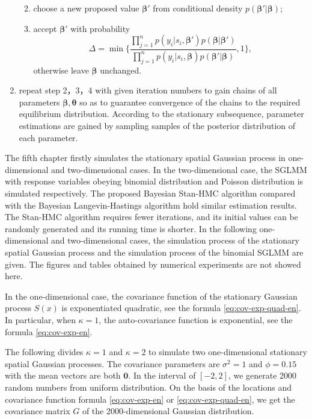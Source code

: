 \documentclass[12pt,a4paper,UTF8,twoside]{book}
\providecommand{\tightlist}{%
  \setlength{\itemsep}{0pt}\setlength{\parskip}{0pt}}
\begin{document}
\begin{enumerate}
  \begin{enumerate}
  \def\labelenumii{(\roman{enumii})}
  \tightlist
  \item
    choose a new proposed value \(\boldsymbol{\beta}'\) from conditional
    density \(p(\boldsymbol{\beta}'|\boldsymbol{\beta})\);
  \item
    accept \(\boldsymbol{\beta}'\) with probability
    \[\Delta = \min \big\{ \frac{\prod_{j=1}^{n}p(y_i|s_{i},\boldsymbol{\beta}')p(\boldsymbol{\beta}|\boldsymbol{\beta}')}{\prod_{j=1}^{n}p(y_i|s_{i},\boldsymbol{\beta})p(\boldsymbol{\beta}'|\boldsymbol{\beta})},1  \big\},\]
    otherwise leave \(\boldsymbol{\beta}\) unchanged.
  \end{enumerate}
\item
  repeat step 2，3，4 with given iteration numbers to gain chains of all
  parameters \(\boldsymbol{\beta},\boldsymbol{\theta}\) so as to
  guarantee convergence of the chains to the required equilibrium
  distribution. According to the stationary subsequence, parameter
  estimations are gained by sampling samples of the posterior
  distribution of each parameter.
\end{enumerate}

The fifth chapter firstly simulates the stationary spatial Gaussian
process in one-dimensional and two-dimensional cases. In the
two-dimensional case, the SGLMM with response variables obeying binomial
distribution and Poisson distribution is simulated respectively. The
proposed Bayesian Stan-HMC algorithm compared with the Bayesian
Langevin-Hastings algorithm hold similar estimation results. The
Stan-HMC algorithm requires fewer iterations, and its initial values can
be randomly generated and its running time is shorter. In the following
one-dimensional and two-dimensional cases, the simulation process of the
stationary spatial Gaussian process and the simulation process of the
binomial SGLMM are given. The figures and tables obtained by numerical
experiments are not showed here.

In the one-dimensional case, the covariance function of the stationary
Gaussian process \(S(x)\) is exponentiated quadratic, see the formula
\eqref{eq:cov-exp-quad-en}. In particular, when \(\kappa =1\), the
auto-covariance function is exponential, see the formula
\eqref{eq:cov-exp-en}.

The following divides \(\kappa =1\) and \(\kappa =2\) to simulate two
one-dimensional stationary spatial Gaussian processes. The covariance
parameters are \(\sigma^2 = 1\) and \(\phi = 0.15\) with the mean
vectors are both \(\mathbf{0}\). In the interval of \([-2,2]\), we
generate 2000 random numbers from uniform distribution. On the basis of
the locations and covariance function formula \eqref{eq:cov-exp-en} or
\eqref{eq:cov-exp-quad-en}, we get the covariance matrix \(G\) of the
2000-dimensional Gaussian distribution.
\end{document}

